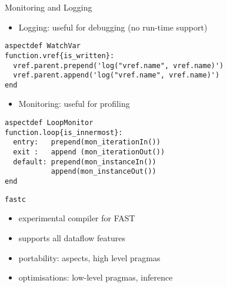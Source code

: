 \begin{frame}[fragile]{Monitoring and Logging}
  \begin{itemize}
  \item Logging: useful for debugging (no run-time support)
  \end{itemize}
  \begin{lstlisting}[label=lst:label, style=lara]
aspectdef WatchVar
function.vref{is_written}:
  vref.parent.prepend('log("vref.name", vref.name)')
  vref.parent.append('log("vref.name", vref.name)')
end
  \end{lstlisting}

  \begin{itemize}
  \item Monitoring: useful for profiling
  \end{itemize}
  \begin{lstlisting}[label=lst:label, style=lara]
aspectdef LoopMonitor
function.loop{is_innermost}:
  entry:   prepend(mon_iterationIn())
  exit :   append (mon_iterationOut())
  default: prepend(mon_instanceIn())
           append(mon_instanceOut())
end
  \end{lstlisting}
\end{frame}

\begin{frame}{\texttt{fastc}}
  \begin{figure}[!ht]
    \centering
    \def\svgwidth{\linewidth}
    
  \end{figure}
  \begin{itemize}
    \setlength{\itemsep}{10pt}
  \item experimental compiler for FAST
  \item supports all dataflow features
  \item portability: aspects, high level pragmas
  \item optimisations: low-level pragmas, inference
  \end{itemize}
\end{frame}
